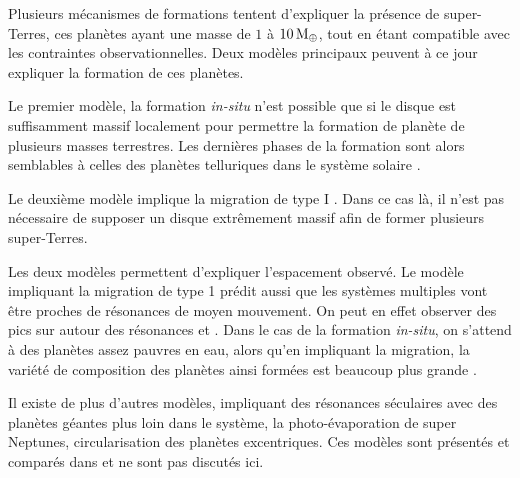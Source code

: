 \bigskip

Plusieurs mécanismes de formations tentent d'expliquer la présence de super-Terres, ces planètes ayant une masse de $1$ à $10\mathrm{\thinspace M_\oplus}$, tout en étant compatible avec les contraintes observationnelles. Deux modèles principaux peuvent à ce jour expliquer la formation de ces planètes. 

Le premier modèle, la \og formation \textit{in-situ}\fg \citep{chiang2013minimum} n'est possible que si le disque est
suffisamment massif localement pour permettre la formation de planète de plusieurs masses terrestres. Les dernières phases de la
formation sont alors semblables à celles des planètes telluriques dans le système solaire \citep{wetherill1990formation,
kenyon2006terrestrial, morbidelli2012building}.

Le deuxième modèle implique la migration de type I \citep{terquem2007migration}. Dans ce cas là, il n'est pas nécessaire de supposer un disque extrêmement massif afin de former plusieurs super-Terres. 

Les deux modèles permettent d'expliquer l'espacement observé. Le modèle impliquant la migration de type 1 prédit aussi que les
systèmes multiples vont être proches de résonances de moyen mouvement. On peut en effet observer des pics sur
 autour des résonances  et  \citep{rein2012period}. Dans le cas de la
formation \textit{in-situ}, on s'attend à des planètes assez pauvres en eau, alors qu'en impliquant la migration, la variété de
composition des planètes ainsi formées est beaucoup plus grande \citep{raymond2008observable}.

Il existe de plus d'autres modèles, impliquant des résonances séculaires avec des planètes géantes plus loin dans le système, la photo-évaporation de super Neptunes, circularisation des planètes excentriques. Ces modèles sont présentés et comparés dans \cite{raymond2008observable} et ne sont pas discutés ici. 

%
%


